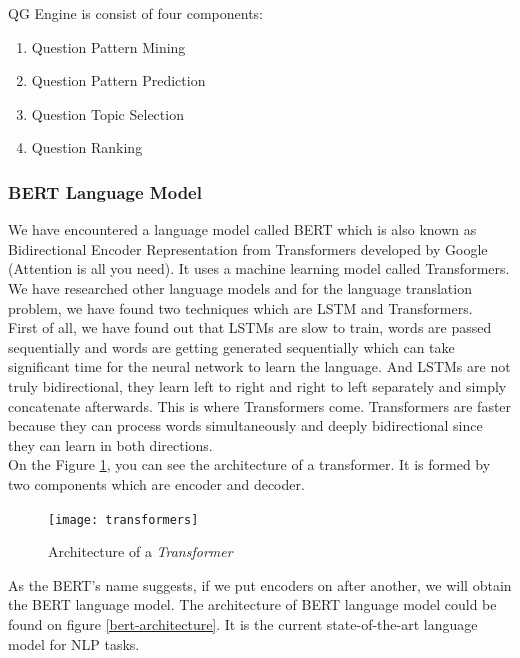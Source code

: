 \documentclass{mefsdp}
\begin{document}
	QG Engine is consist of four components:
	\begin{enumerate}
		\item Question Pattern Mining
		\item Question Pattern Prediction
		\item Question Topic Selection
		\item Question Ranking
	\end{enumerate}
	\subsubsection{BERT Language Model}
	We have encountered a language model called BERT which is also known as Bidirectional Encoder Representation from Transformers developed by Google (Attention is all you need). It uses a machine learning model called Transformers. We have researched other language models and for the language translation problem, we have found two techniques which are LSTM and Transformers.\\
	
	First of all, we have found out that LSTMs are slow to train, words are passed sequentially and words are getting generated sequentially which can take significant time for the neural network to learn the language. And LSTMs are not truly bidirectional, they learn left to right and right to left separately and simply concatenate afterwards. This is where Transformers come. Transformers are faster because they can process words simultaneously and deeply bidirectional since they can learn in both directions. \\
	
	On the Figure \ref{transformer}, you can see the architecture of a transformer. It is formed by two components which are encoder and decoder.\\
	\begin{figure}[ht!]
		\centering
		\texttt{[image: transformers]}
		\caption{Architecture of a \textit{Transformer}\label{transformer}}
	\end{figure}

	As the BERT’s name suggests, if we put encoders on after another, we will obtain the BERT language model. The architecture of BERT language model could be found on figure \ref{bert-architecture}. It is the current state-of-the-art language model for NLP tasks. \cite{chan-fan-2019-recurrent}
	
\end{document}
